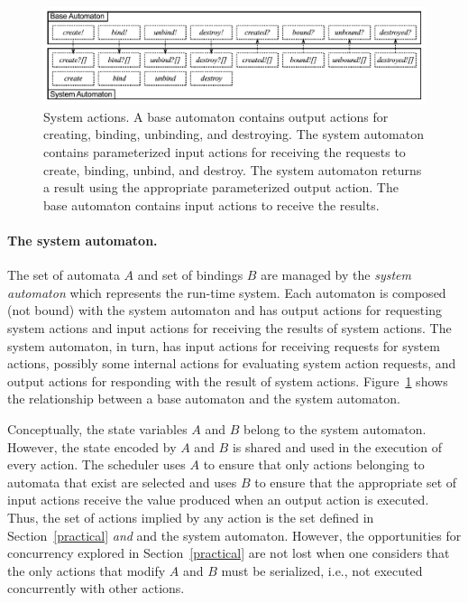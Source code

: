 
\begin{figure}
\center
\includegraphics[width=\textwidth]{system_action}
\caption{System actions.
  A base automaton contains output actions for creating, binding, unbinding, and destroying.
  The system automaton contains parameterized input actions for receiving the requests to create, binding, unbind, and destroy.
  The system automaton returns a result using the appropriate parameterized output action.
  The base automaton contains input actions to receive the results.}
\label{system_action}
\end{figure}

\paragraph{The system automaton.}
The set of automata $A$ and set of bindings $B$ are managed by the \emph{system automaton} which represents the run-time system.
Each automaton is composed (not bound) with the system automaton and has output actions for requesting system actions and input actions for receiving the results of system actions.
The system automaton, in turn, has input actions for receiving requests for system actions, possibly some internal actions for evaluating system action requests, and output actions for responding with the result of system actions.
Figure~\ref{system_action} shows the relationship between a base automaton and the system automaton.

Conceptually, the state variables $A$ and $B$ belong to the system automaton.
However, the state encoded by $A$ and $B$ is shared and used in the execution of every action.
The scheduler uses $A$ to ensure that only actions belonging to automata that exist are selected and uses $B$ to ensure that the appropriate set of input actions receive the value produced when an output action is executed.
Thus, the set of actions implied by any action is the set defined in Section~\ref{practical} \emph{and} and the system automaton.
However, the opportunities for concurrency explored in Section~\ref{practical} are not lost when one considers that the only actions that modify $A$ and $B$ must be serialized, i.e., not executed concurrently with other actions.


